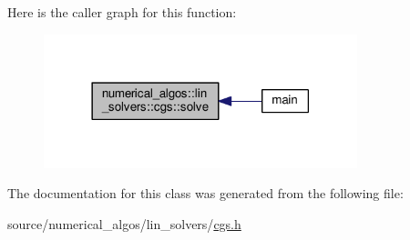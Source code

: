 Here is the caller graph for this function\-:
\nopagebreak
\begin{figure}[H]
\begin{center}
\leavevmode
\includegraphics[width=258pt]{classnumerical__algos_1_1lin__solvers_1_1cgs_a76503cf7b66739a4fa4571f034aa960e_icgraph}
\end{center}
\end{figure}




The documentation for this class was generated from the following file\-:\begin{DoxyCompactItemize}
\item 
source/numerical\-\_\-algos/lin\-\_\-solvers/\hyperlink{cgs_8h}{cgs.\-h}\end{DoxyCompactItemize}
